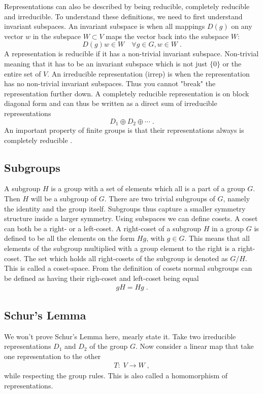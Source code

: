 Representations can also be described by being reducible, completely reducible and irreducible. To understand these definitions, we need to first understand invariant subspaces. An invariant subspace is when all mappings $D(g)$ on any vector $w$ in the subspace $W\subset V $ maps the vector back into the subspace $W$:
\begin{equation}
    D(g)w\in W\quad \forall g\in G, w\in W\;.
\end{equation}
A representation is reducible if it has a non-trivial invariant subspace. Non-trivial meaning that it has to be an invariant subspace which is not just $\{0\}$ or the entire set of $V$. An irreducible representation (irrep) is when the representation has no non-trivial invariant subspaces. Thus you cannot "break" the representation further down. A completely reducible representation is on block diagonal form and can thus be written as a direct sum of irreducible representations
\begin{equation}
    D_1\oplus D_2 \oplus \cdots\;.
\end{equation}
An important property of finite groups is that their representations always is completely reducible \cite{Georgi1999}.


\subsection{Subgroups}
A subgroup $H$ is a group with a set of elements which all is a part of a group $G$. Then $H$ will be a subgroup of $G$. There are two trivial subgroups of $G$, namely the identity and the group itself. Subgroups thus capture a smaller symmetry structure inside a larger symmetry.
Using subspaces we can define cosets. A coset can both be a right- or a left-coset. A right-coset of a subgroup $H$ in a group $G$ is defined to be all the elements on the form $Hg$, with $g\in G$. This means that all elements of the subgroup multiplied with a group element to the right is a right-coset. The set which holds all right-cosets of the subgroup is denoted as $G/H$. This is called a coset-space. From the definition of cosets normal subgroups can be defined as having their righ-coset and left-coset being equal
\begin{align}
    gH=Hg\;.
\end{align}


\subsection{Schur's Lemma}
We won't prove Schur's Lemma here, mearly state it. Take two irreducible representations $D_1$ and $D_2$ of the group $G$. Now consider a linear map that take one representation to the other
\begin{align}
    T:\;V\to W\;,
\end{align}
while respecting the group rules. This is also called a homomorphism of representations.



